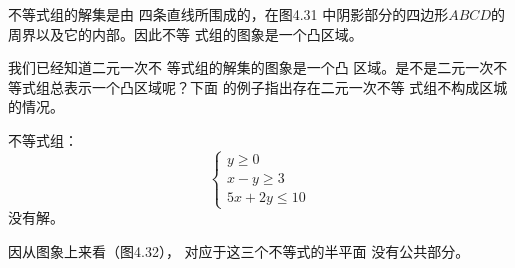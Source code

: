 \begin{solution}
不等式组的解集是由
四条直线所围成的，在图4.31
中阴影部分的四边形$ABCD$的
周界以及它的内部。因此不等
式组的图象是一个凸区域。
\end{solution}

我们已经知道二元一次不
等式组的解集的图象是一个凸
区域。是不是二元一次不等式组总表示一个凸区域呢？下面
的例子指出存在二元一次不等
式组不构成区城的情况。

\begin{example}
   不等式组：
   \[\begin{cases}
    y\ge 0\\
    x-y\ge 3\\
    5x+2y\le 10    
   \end{cases}\]
没有解。 
\end{example}

\begin{solution}
    因从图象上来看（图4.32），
对应于这三个不等式的半平面
没有公共部分。


\end{solution}

